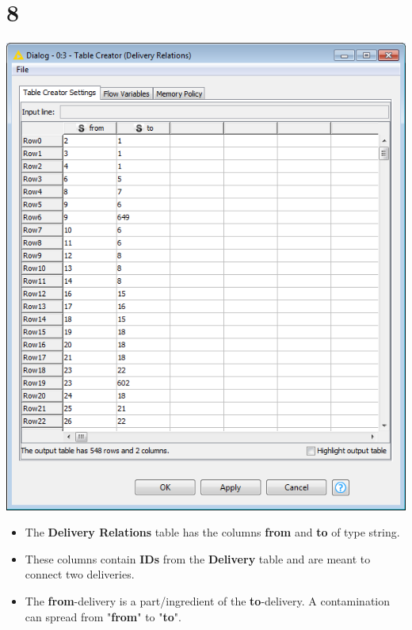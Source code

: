 \documentclass{beamer}
\begin{document}
\section{8}
\begin{frame}
	\begin{center}
  		\includegraphics[height=0.6\textheight]{8.png}
	\end{center}
	\begin{itemize}
		\item The \textbf{Delivery Relations} table has the columns \textbf{from} and \textbf{to} of type string.
		\item These columns contain \textbf{IDs} from the \textbf{Delivery} table and are meant to connect two deliveries.
		\item The \textbf{from}-delivery is a part/ingredient of the \textbf{to}-delivery. A contamination can spread from "\textbf{from}" to "\textbf{to}".
	\end{itemize}
\end{frame}
\end{document}
